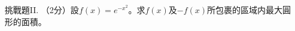 \documentclass[12pt]{article}
\begin{document}
\begin{enumerate}
        \hrulefill

        \hrulefill

        \hrulefill

        \hrulefill

        \hrulefill

        \hrulefill

        \hrulefill

        \hrulefill
        \item[挑戰題II.] （2分）設$f(x)=e^{-x^2}$。求$f(x)$及$-f(x)$所包裹的區域内最大圓形的面積。

        \hrulefill

        \hrulefill

        \hrulefill

        \hrulefill

        \hrulefill

        \hrulefill

        \hrulefill

        \hrulefill

        \hrulefill

        \hrulefill

        \hrulefill

        \hrulefill

        \hrulefill

        \hrulefill

        \hrulefill

        \hrulefill

        \hrulefill

        \hrulefill

        \hrulefill

        \hrulefill

        \hrulefill

        \hrulefill

        \hrulefill

        \hrulefill

        \hrulefill

        \hrulefill

        \hrulefill

        \hrulefill

        \hrulefill

        \hrulefill

        \hrulefill

        \hrulefill

        \hrulefill

        \hrulefill


\end{enumerate}
\end{document}
